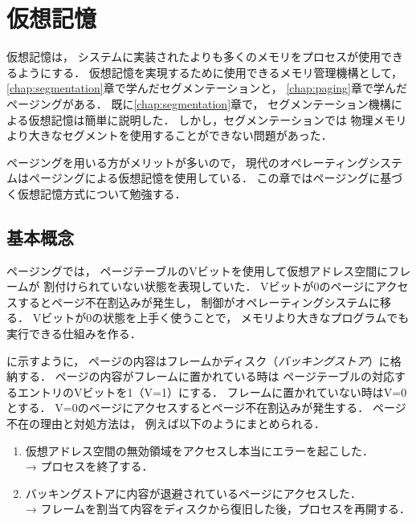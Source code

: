\chapter{仮想記憶}
\label{virtualMemory}
仮想記憶は，
システムに実装されたよりも多くのメモリをプロセスが使用できるようにする．
仮想記憶を実現するために使用できるメモリ管理機構として，
\ref{chap:segmentation}章で学んだセグメンテーションと，
\ref{chap:paging}章で学んだページングがある．
既に\ref{chap:segmentation}章で，
セグメンテーション機構による仮想記憶は簡単に説明した．
しかし，セグメンテーションでは
物理メモリより大きなセグメントを使用することができない問題があった．

ページングを用いる方がメリットが多いので，
現代のオペレーティングシステムはページングによる仮想記憶を使用している．
この章ではページングに基づく仮想記憶方式について勉強する．

\section{基本概念}
ページングでは，
ページテーブルのVビットを使用して仮想アドレス空間にフレームが
割付けられていない状態を表現していた．
Vビットが0のページにアクセスするとページ不在割込みが発生し，
制御がオペレーティングシステムに移る．
Vビットが0の状態を上手く使うことで，
メモリより大きなプログラムでも実行できる仕組みを作る．

に示すように，
ページの内容はフレームかディスク（\emph{バッキングストア}）に格納する．
ページの内容がフレームに置かれている時は
ページテーブルの対応するエントリのVビットを1（V=1）にする．
フレームに置かれていない時はV=0とする．
V=0のページにアクセスするとページ不在割込みが発生する．
ページ不在の理由と対処方法は，
例えば以下のようにまとめられる．

\begin{enumerate}
\item 仮想アドレス空間の無効領域をアクセスし本当にエラーを起こした．\\
  → プロセスを終了する．
\item バッキングストアに内容が退避されているページにアクセスした．\\
  → フレームを割当て内容をディスクから復旧した後，プロセスを再開する．
\end{enumerate}

